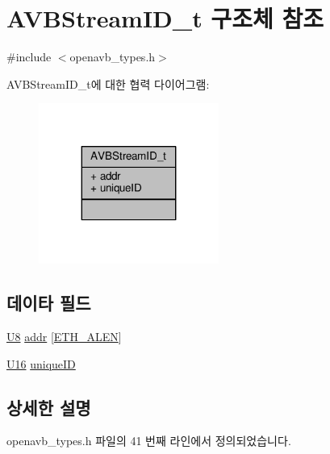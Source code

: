 \hypertarget{struct_a_v_b_stream_i_d__t}{}\section{A\+V\+B\+Stream\+I\+D\+\_\+t 구조체 참조}
\label{struct_a_v_b_stream_i_d__t}


{\ttfamily \#include $<$openavb\+\_\+types.\+h$>$}



A\+V\+B\+Stream\+I\+D\+\_\+t에 대한 협력 다이어그램\+:
\nopagebreak
\begin{figure}[H]
\begin{center}
\leavevmode
\includegraphics[width=167pt]{struct_a_v_b_stream_i_d__t__coll__graph}
\end{center}
\end{figure}
\subsection*{데이타 필드}
\begin{DoxyCompactItemize}
\item 
\hyperlink{openavb__types__base__pub_8h_aa63ef7b996d5487ce35a5a66601f3e73}{U8} \hyperlink{struct_a_v_b_stream_i_d__t_a48d52ffa49f2036631c913b36c85de02}{addr} \mbox{[}\hyperlink{avb__avtp_8h_a9822d89774e0d6ddaa06503950130423}{E\+T\+H\+\_\+\+A\+L\+EN}\mbox{]}
\item 
\hyperlink{openavb__types__base__pub_8h_a0a0a322d5fa4a546d293a77ba8b4a71f}{U16} \hyperlink{struct_a_v_b_stream_i_d__t_a7f5a958848a2b027d9f08e063b2e16a1}{unique\+ID}
\end{DoxyCompactItemize}


\subsection{상세한 설명}


openavb\+\_\+types.\+h 파일의 41 번째 라인에서 정의되었습니다.



